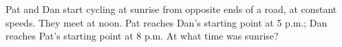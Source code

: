 Pat and Dan start cycling at sunrise from opposite ends of a road, at constant speeds. They meet at noon. Pat reaches Dan's starting point at 5 p.m.; Dan reaches Pat's starting point at 8 p.m. At what time was sunrise?
